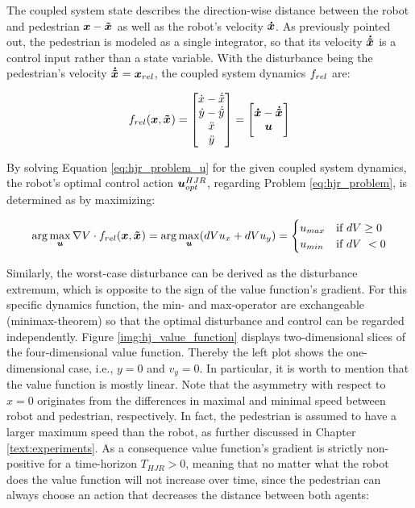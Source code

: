 The coupled system state describes the direction-wise distance between the robot and pedestrian $\x - \xped[]$ as well as the robot's velocity $\boldsymbol{\dot{x}}$. As previously pointed out, the pedestrian is modeled as a single integrator, so that its velocity $\dxped[]$ is a control input rather than a state variable. With the disturbance being the pedestrian's velocity $\dxped[] = \d$, the coupled system dynamics $f_{rel}$ are:

\begin{equation}
\frel(\x, \xped[]) =
\begin{bmatrix}
\dot{x} - \dot{\tilde{x}} \\
\dot{y} - \dot{\tilde{y}} \\
\ddot{x} \\
\ddot{y}
\end{bmatrix} =
\begin{bmatrix}
\dx - \dxped[] \\
\u
\end{bmatrix}
\label{eq:hj_dynamics}
\end{equation}

By solving Equation \ref{eq:hjr_problem_u} for the given coupled system dynamics, the robot's optimal control action $\boldsymbol{u}_{opt}^{HJR}$, regarding Problem \ref{eq:hjr_problem}, is determined as by maximizing:

\begin{equation}
\arg \max_{\u} \nabla \Vrel \cdot \frel(\x, \xped[]) = \arg \max_{\u} (d\Vrel u_x + d\Vrel u_y) =
\begin{cases}
u_{max} & \text{if } d\Vrel \geq 0 \\
u_{min} & \text{if } d\Vrel < 0
\end{cases}
\label{eq:hj_u_opt}
\end{equation}

Similarly, the worst-case disturbance can be derived as the disturbance extremum, which is opposite to the sign of the value function's gradient. For this specific dynamics function, the min- and max-operator are exchangeable (minimax-theorem) so that the optimal disturbance and control can be regarded independently.
\newline
Figure \ref{img:hj_value_function} displays two-dimensional slices of the four-dimensional value function. Thereby the left plot shows the one-dimensional case, i.e., $y = 0$ and $v_y = 0$. In particular, it is worth to mention that the value function is mostly linear. Note that the asymmetry with respect to $x = 0$ originates from the differences in maximal and minimal speed between robot and pedestrian, respectively.  In fact, the pedestrian is assumed to have a larger maximum speed than the robot, as further discussed in Chapter \ref{text:experiments}. As a consequence value function's gradient is strictly non-positive for a time-horizon $T_{HJR} > 0$, meaning that no matter what the robot does the value function will not increase over time, since the pedestrian can always choose an action that decreases the distance between both agents:

